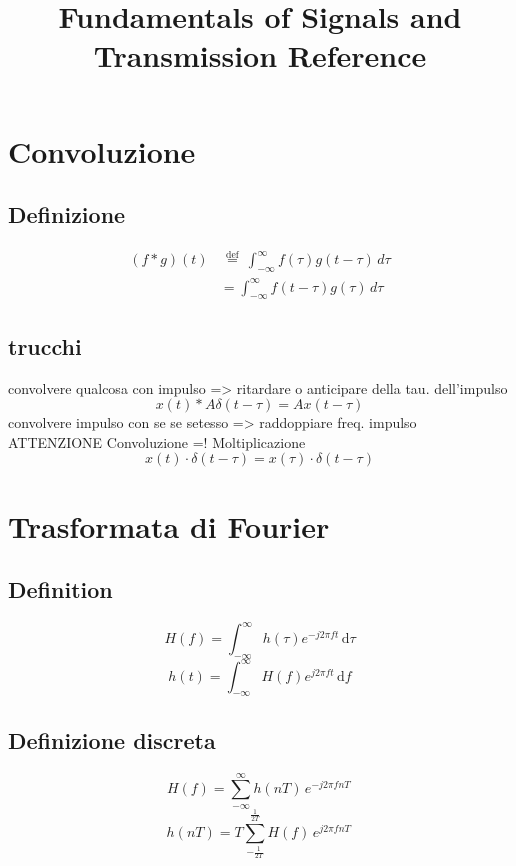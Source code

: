 \documentclass[12pt,a4paper,]{article}
\title{Fundamentals of Signals and Transmission Reference}
\date{}
\author{}
\begin{document}
\maketitle
\section{Convoluzione}
\subsection{Definizione}

\begin{align}
(f * g )(t) & \, \stackrel{\mathrm{def}}{=}\ \int_{-\infty}^\infty f(\tau) g(t - \tau) \, d\tau \\
& = \int_{-\infty}^\infty f(t-\tau) g(\tau)\, d\tau
\end{align}
\subsection{trucchi}
convolvere qualcosa con impulso => ritardare o anticipare della tau. dell'impulso\\
\begin{equation}
x(t) \ast A \delta(t-\tau) = Ax(t-\tau)
\end{equation}
convolvere impulso con se se setesso => raddoppiare freq. impulso \\
ATTENZIONE Convoluzione =! Moltiplicazione
\begin{equation}
x(t)\cdot\delta(t-\tau) = x(\tau)\cdot\delta(t-\tau)
\end{equation}

\section{Trasformata di Fourier}
\subsection{Definition}
\begin{equation}
H(f) = \int_{-\infty}^{\infty} \! h(\tau) e^{-j2\pi ft} \, \mathrm{d}\tau
\end{equation}
\begin{equation}
h(t) = \int_{-\infty}^{\infty} \! H(f) e^{j2\pi ft} \, \mathrm{d}f
\end{equation}
\subsection{Definizione discreta}
\begin{equation}
H(f) = \sum_{-\infty}^{\infty} \! h(nT) \,  e^{-j2\pi fnT} \, 
\end{equation}
\begin{equation}
h(nT) =T  \sum_{-\frac{1}{2T}}^{\frac{1}{2T}} \! H(f) \, e^{j2\pi fnT} \,
\end{equation}
\end{document}
